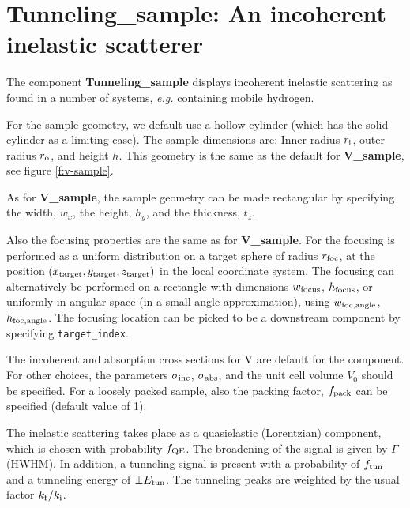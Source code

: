 \section{Tunneling\_sample: An incoherent inelastic scatterer}
\label{s:Tunneling_sample}


The component {\bf Tunneling\_sample}
displays incoherent inelastic scattering as found in a number of systems, {\em e.g.}
containing mobile hydrogen. 

For the sample geometry, we default use a
hollow cylinder (which has the solid cylinder as a limiting case).
The sample dimensions are: Inner radius $r_{\rm i}$,
outer radius $r_{\rm o}$, and height $h$. This geometry is the same as 
the default for {\bf V\_sample}, see figure \ref{f:v-sample}.

As for {\bf V\_sample}, the sample geometry can be made rectangular 
by specifying the width, $w_x$, the height, $h_y$, and the thickness, $t_z$.

Also the focusing properties are the same as for {\bf V\_sample}.
For the focusing is performed as a uniform distribution on
a target sphere of radius $r_{\rm foc}$, at the position
$(x_{\rm target},y_{\rm target},z_{\rm target})$
in the local coordinate system.
The focusing can alternatively be performed on a rectangle with dimensions
$w_{\rm focus}$, $h_{\rm focus}$, or uniformly in angular space
(in a small-angle approximation),
using $w_{\rm foc, angle}$, $h_{\rm foc, angle}$.
The focusing location can be picked to be a downstream component by
specifying \verb+target_index+.

The incoherent and absorption cross sections for V are default
for the component. For other choices, the
parameters $\sigma_{\rm inc}$, $\sigma_{\rm abs}$,
and the unit cell volume $V_0$ should be specified.
For a loosely packed sample, also the packing factor, $f_{\rm pack}$
can be specified (default value of 1).

The inelastic scattering takes place as a quasielastic (Lorentzian)
component, which is chosen with probability $f_{\rm QE}$.
The broadening of the signal is given by $\Gamma$ (HWHM).
In addition, a tunneling signal is present with a probability of $f_{\rm tun}$ 
and a tunneling energy of $\pm E_{\rm tun}$. 
The tunneling peaks are weighted by the usual factor $k_{\rm f}/k_{\rm i}$.

